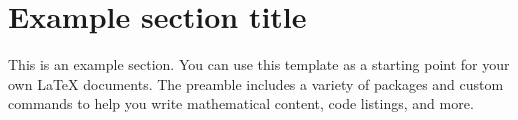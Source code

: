 \section{Example section title}

This is an example section. You can use this template as a starting point for your own LaTeX documents. The preamble includes a variety of packages and custom commands to help you write mathematical content, code listings, and more.